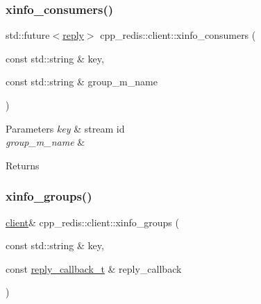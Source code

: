 \subsubsection{\texorpdfstring{xinfo\+\_\+consumers()}{xinfo\_consumers()}\hspace{0.1cm}{\footnotesize\ttfamily [2/2]}}
{\footnotesize\ttfamily std\+::future$<$\mbox{\hyperlink{classcpp__redis_1_1reply}{reply}}$>$ cpp\+\_\+redis\+::client\+::xinfo\+\_\+consumers (\begin{DoxyParamCaption}\item[{const std\+::string \&}]{key,  }\item[{const std\+::string \&}]{group\+\_\+m_name }\end{DoxyParamCaption})}






\begin{DoxyParams}{Parameters}
{\em key} & stream id \\
\hline
{\em group\+\_\+m_name} & \\
\hline
\end{DoxyParams}
\begin{DoxyReturn}{Returns}

\end{DoxyReturn}
\mbox{\label{classcpp__redis_1_1client_a99175a1ba56a05cc75c531860aaf5442}} 
\subsubsection{\texorpdfstring{xinfo\+\_\+groups()}{xinfo\_groups()}\hspace{0.1cm}{\footnotesize\ttfamily [1/2]}}
{\footnotesize\ttfamily \mbox{\hyperlink{classcpp__redis_1_1client}{client}}\& cpp\+\_\+redis\+::client\+::xinfo\+\_\+groups (\begin{DoxyParamCaption}\item[{const std\+::string \&}]{key,  }\item[{const \mbox{\hyperlink{classcpp__redis_1_1client_af7a65eb21aa25230bfbb0b0203c4fc04}{reply\+\_\+callback\+\_\+t}} \&}]{reply\+\_\+callback }\end{DoxyParamCaption})}






